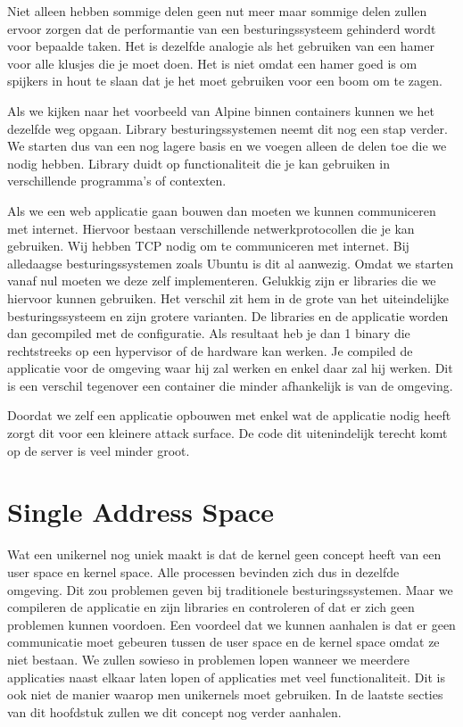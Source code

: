 \documentclass[pdftex,a4paper,12pt,twoside]{report}
\begin{document}
Niet alleen hebben sommige delen geen nut meer maar sommige delen zullen ervoor zorgen dat de performantie van een besturingssysteem gehinderd wordt voor bepaalde taken. Het is dezelfde analogie als het gebruiken van een hamer voor alle klusjes die je moet doen. Het is niet omdat een hamer goed is om spijkers in hout te slaan dat je het moet gebruiken voor een boom om te zagen. 

Als we kijken naar het voorbeeld van Alpine binnen containers kunnen we het dezelfde weg opgaan. Library besturingssystemen neemt dit nog een stap verder. We starten dus van een nog lagere basis en we voegen alleen de delen toe die we nodig hebben. Library duidt op functionaliteit die je kan gebruiken in verschillende programma's of contexten. 

Als we een web applicatie gaan bouwen dan moeten we kunnen communiceren met internet. Hiervoor bestaan verschillende netwerkprotocollen die je kan gebruiken. Wij hebben TCP nodig om te communiceren met internet. Bij alledaagse besturingssystemen zoals Ubuntu is dit al aanwezig. Omdat we starten vanaf nul moeten we deze zelf implementeren. Gelukkig zijn er libraries die we hiervoor kunnen gebruiken. Het verschil zit hem in de grote van het uiteindelijke besturingssysteem en zijn grotere varianten. De libraries en de applicatie worden dan gecompiled met de configuratie. Als resultaat heb je dan 1 binary die rechtstreeks op een hypervisor of de hardware kan werken. Je compiled de applicatie voor de omgeving waar hij zal werken en enkel daar zal hij werken. Dit is een verschil tegenover een container die minder afhankelijk is van de omgeving.

Doordat we zelf een applicatie opbouwen met enkel wat de applicatie nodig heeft zorgt dit voor een kleinere attack surface. De code dit uitenindelijk terecht komt op de server is veel minder groot.

\section{Single Address Space}

Wat een unikernel nog uniek maakt is dat de kernel geen concept heeft van een user space en kernel space. Alle processen bevinden zich dus in dezelfde omgeving. Dit zou problemen geven bij traditionele besturingssystemen. Maar we compileren de applicatie en zijn libraries en controleren of dat er zich geen problemen kunnen voordoen. Een voordeel dat we kunnen aanhalen is dat er geen communicatie moet gebeuren tussen de user space en de kernel space omdat ze niet bestaan. We zullen sowieso in problemen lopen wanneer we meerdere applicaties naast elkaar laten lopen of applicaties met veel functionaliteit. Dit is ook niet de manier waarop men unikernels moet gebruiken. In de laatste secties van dit hoofdstuk zullen we dit concept nog verder aanhalen. 
\end{document}
